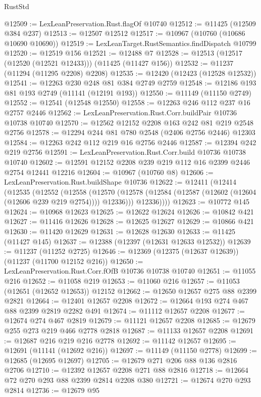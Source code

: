\begin{lexlean}{RustStd}
\begin{coremodule}
@12509 := LexLeanPreservation.Rust.flagOf @10740
@12512 := @11425 (@12509 @384 @237)
@12513 := @12507 @12512
@12517 := @10967 (@10760 (@10686 @10690 @10690))
@12519 := LexLeanTarget.RustSemantics.findDispatch @10799
@12520 := @12519 @156
@12521 := @12488 @7
@12528 := @12513 (@12517 (@12520 (@12521 @12433))) (@11425 (@11427 @156))
@12532 := @11237 (@11294 (@11295 @2208) @2208)
@12535 := @12420 (@12423 (@12528 @12532))
@12541 := @12263 @230 @248 @81 @384 @2749 @2759
@12548 := @12186 @193 @81 @193 @2749 (@11141 (@12191 @193))
@12550 := @11149 (@11150 @2749)
@12552 := @12541 (@12548 @12550)
@12558 := @12263 @246 @112 @237 @16 @2757 @2446
@12562 := LexLeanPreservation.Rust.Corr.buildPair @10736 @10738 @10740
@12570 := @12562 @12152 @2208 @163 @242 @81 @219 @2548 @2756
@12578 := @12294 @244 @81 @780 @2548 (@2406 @2756 @2446) @12303
@12584 := @12263 @242 @112 @219 @16 @2756 @2446
@12587 := @12394 @242 @219 @2756
@12591 := LexLeanPreservation.Rust.Corr.build @10736 @10738 @10740
@12602 := @12591 @12152 @2208 @239 @219 @112 @16 @2399 @2446 @2754 @12441 @12216
@12604 := @10967 (@10760 @8)
@12606 := LexLeanPreservation.Rust.buildShape @10736
@12622 := @12411
    (@12414
      (@12535
        (@12552
          (@12558
            (@12570 (@12578 (@12584 (@12587 (@12602 (@12604 (@12606 @239 @219 @2754)))) @12336)))
            @12336))))
@12623 := @10772 @145
@12624 := @10968 @12623
@12625 := @12622 @12624
@12626 := @10842 @421
@12627 := @11416 @12626
@12628 := @12625 @12627
@12629 := @10866 @421
@12630 := @11420 @12629
@12631 := @12628 @12630
@12633 := @11425 (@11427 @145)
@12637 := @12388 (@12397 (@12631 @12633 @12532))
@12639 := @11237 (@11252 @2725)
@12646 := @12369 (@12375 (@12637 @12639)) (@11237 (@11700 @12152 @216))
@12650 := LexLeanPreservation.Rust.Corr.fOfB @10736 @10738 @10740
@12651 := @11055 @216
@12652 := @11058 @219
@12653 := @11060 @216
@12657 := @11053 (@12651 (@12652 @12653)) @12152
@12662 := @12650 @12657 @275 @88 @2399 @2821
@12664 := @12401 @12657 @2208
@12672 := @12664 @193 @274 @467 @88 @2399 @2819 @2282 @491
@12674 := @11112 @12657 @2208
@12677 := @12674 @274 @467 @2819
@12679 := @11121 @12657 @2208
@12685 := @12679 @255 @273 @219 @466 @2778 @2818
@12687 := @11133 @12657 @2208
@12691 := @12687 @216 @219 @216 @2778
@12692 := @11142 @12657
@12695 := @12691 (@11141 (@12692 @216))
@12697 := @11149 (@11150 @2778)
@12699 := @12685 (@12695 @12697)
@12705 := @12679 @271 @206 @88 @136 @2816 @2706
@12710 := @12392 @12657 @2208 @271 @88 @2816
@12718 := @12664 @72 @270 @293 @88 @2399 @2814 @2208 @380
@12721 := @12674 @270 @293 @2814
@12736 := @12679
    @95

\end{coremodule}
\end{lexlean}
